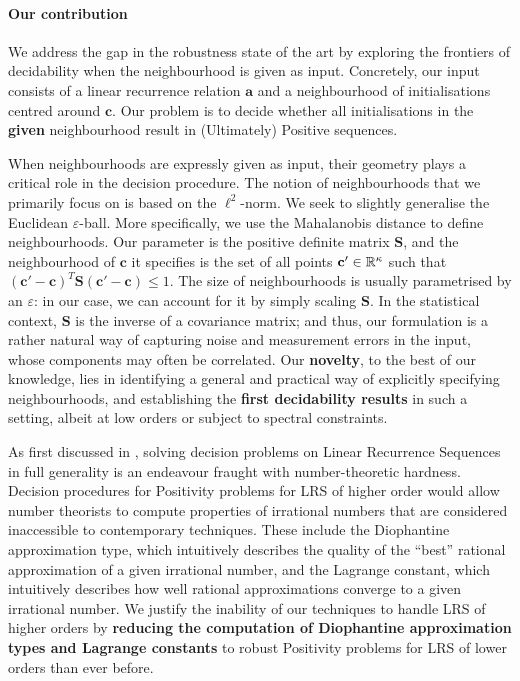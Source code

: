 \paragraph*{Our contribution}
We address the gap in the robustness state of the art by exploring the frontiers of decidability when the neighbourhood is given as input. Concretely, our input consists of a linear recurrence relation $\mathbf{a}$ and a neighbourhood of initialisations centred around $\mathbf{c}$. Our problem is to decide whether all initialisations in the \textbf{given} neighbourhood result in (Ultimately) Positive sequences. 

When neighbourhoods are expressly given as input, their geometry plays a critical role in the decision procedure. The notion of neighbourhoods that we primarily focus on is based on the $\ell^2$-norm. We seek to slightly generalise the Euclidean $\varepsilon$-ball. More specifically, we use the Mahalanobis distance to define neighbourhoods. Our parameter is the positive definite matrix $\mathbf{S}$, and the neighbourhood of $\mathbf{c}$ it specifies is the set of all points $\mathbf{c'} \in \mathbb{R}^{\kappa}$ such that $(\mathbf{c'} - \mathbf{c})^T\mathbf{S}(\mathbf{c'} - \mathbf{c}) \le 1$. The size of neighbourhoods is usually parametrised by an $\varepsilon$: in our case, we can account for it by simply scaling $\mathbf{S}$. In the statistical context, $\mathbf{S}$ is the inverse of a covariance matrix; and thus, our formulation is a rather natural way of capturing noise and measurement errors in the input, whose components may often be correlated. Our \textbf{novelty}, to the best of our knowledge, lies in identifying a general and practical way of explicitly specifying neighbourhoods, and establishing the \textbf{first decidability results} in such a setting, albeit at low orders or subject to spectral constraints.

As first discussed in \cite[Section 5]{joeljames3}, solving decision problems on Linear Recurrence Sequences in full generality is an endeavour fraught with number-theoretic hardness. Decision procedures for Positivity problems for LRS of higher order would allow number theorists to compute properties of irrational numbers that are considered inaccessible to contemporary techniques. These include the Diophantine approximation type, which intuitively describes the quality of the ``best'' rational approximation of a given irrational number, and the Lagrange constant, which intuitively describes how well rational approximations converge to a given irrational number. We justify the inability of our techniques to handle LRS of higher orders by \textbf{reducing the computation of Diophantine approximation types and Lagrange constants} to robust Positivity problems for LRS of lower orders than ever before.

